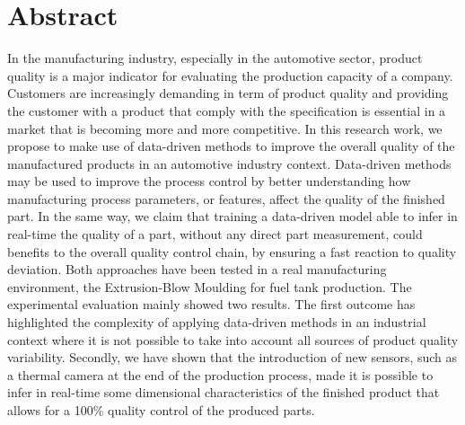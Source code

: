\chapter*{Abstract}

In the manufacturing industry, especially in the automotive sector, product quality is a major indicator for evaluating the production capacity of a company. Customers are increasingly demanding in term of product quality and providing the customer with a product that comply with the specification is essential in a market that is becoming more and more competitive. In this research work, we propose to make use of data-driven methods to improve the overall quality of the manufactured products in an automotive industry context. Data-driven methods may be used to improve the process control by better understanding how manufacturing process parameters, or features,  affect the quality of the finished part. In the same way, we claim that training a data-driven model able to infer in real-time the quality of a part, without any direct part measurement, could benefits to the overall quality control chain, by ensuring a fast reaction to quality deviation. Both approaches have been tested in a real manufacturing environment, the Extrusion-Blow Moulding for fuel tank production. The experimental evaluation mainly showed two results. The first outcome has highlighted the complexity of applying data-driven methods in an industrial context where it is not possible to take into account all sources of product quality variability. Secondly, we have shown that the introduction of new sensors, such as a thermal camera at the end of the production process, made it is possible to infer in real-time some dimensional characteristics of the finished product that allows for a 100\% quality control of the produced parts.   